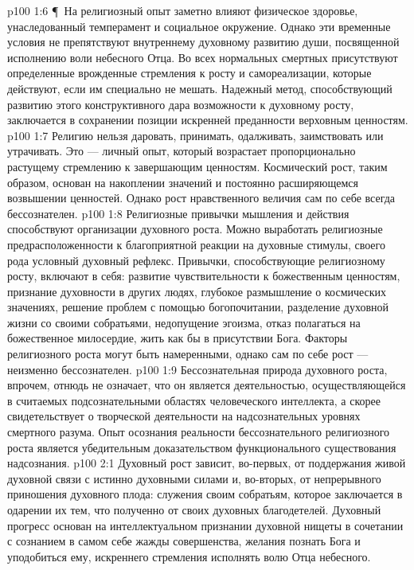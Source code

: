 \vs p100 1:6 \P\ На религиозный опыт заметно влияют физическое здоровье, унаследованный темперамент и социальное окружение. Однако эти временные условия не препятствуют внутреннему духовному развитию души, посвященной исполнению воли небесного Отца. Во всех нормальных смертных присутствуют определенные врожденные стремления к росту и самореализации, которые действуют, если им специально не мешать. Надежный метод, способствующий развитию этого конструктивного дара возможности к духовному росту, заключается в сохранении позиции искренней преданности верховным ценностям.
\vs p100 1:7 Религию нельзя даровать, принимать, одалживать, заимствовать или утрачивать. Это --- личный опыт, который возрастает пропорционально растущему стремлению к завершающим ценностям. Космический рост, таким образом, основан на накоплении значений и постоянно расширяющемся возвышении ценностей. Однако рост нравственного величия сам по себе всегда бессознателен.
\vs p100 1:8 Религиозные привычки мышления и действия способствуют организации духовного роста. Можно выработать религиозные предрасположенности к благоприятной реакции на духовные стимулы, своего рода условный духовный рефлекс. Привычки, способствующие религиозному росту, включают в себя: развитие чувствительности к божественным ценностям, признание духовности в других людях, глубокое размышление о космических значениях, решение проблем с помощью богопочитании, разделение духовной жизни со своими собратьями, недопущение эгоизма, отказ полагаться на божественное милосердие, жить как бы в присутствии Бога. Факторы религиозного роста могут быть намеренными, однако сам по себе рост --- неизменно бессознателен.
\vs p100 1:9 Бессознательная природа духовного роста, впрочем, отнюдь не означает, что он является деятельностью, осуществляющейся в считаемых подсознательными областях человеческого интеллекта, а скорее свидетельствует о творческой деятельности на надсознательных уровнях смертного разума. Опыт осознания реальности бессознательного религиозного роста является убедительным доказательством функционального существования надсознания.
\vs p100 2:1 Духовный рост зависит, во\hyp{}первых, от поддержания живой духовной связи с истинно духовными силами и, во\hyp{}вторых, от непрерывного приношения духовного плода: служения своим собратьям, которое заключается в одарении их тем, что полученно от своих духовных благодетелей. Духовный прогресс основан на интеллектуальном признании духовной нищеты в сочетании с сознанием в самом себе жажды совершенства, желания познать Бога и уподобиться ему, искреннего стремления исполнять волю Отца небесного.
